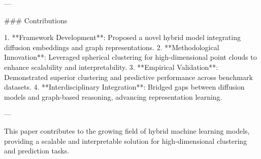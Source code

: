 ---

### Contributions

1. **Framework Development**: Proposed a novel hybrid model integrating diffusion embeddings and graph representations.
2. **Methodological Innovation**: Leveraged spherical clustering for high-dimensional point clouds to enhance scalability and interpretability.
3. **Empirical Validation**: Demonstrated superior clustering and predictive performance across benchmark datasets.
4. **Interdisciplinary Integration**: Bridged gaps between diffusion models and graph-based reasoning, advancing representation learning.

--- 

This paper contributes to the growing field of hybrid machine learning models, providing a scalable and interpretable solution for high-dimensional clustering and prediction tasks.